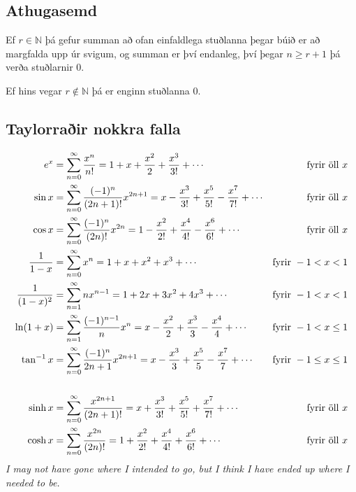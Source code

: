 \documentclass[b5paper,10pt,icelandic]{sphinxmanual}
\begin{document}
\subsection{Athugasemd}
\label{kafli10:id6}
Ef \(r \in {{\mathbb  N}}\) þá gefur summan að ofan einfaldlega
stuðlanna þegar búið er að margfalda upp úr svigum, og summan er því
endanleg, því þegar \(n \geq r+1\) þá verða stuðlarnir 0.

Ef hins vegar \(r\notin {{\mathbb  N}}\) þá er enginn stuðlanna 0.


\subsection{Taylorraðir nokkra falla}
\label{kafli10:taylorrair-nokkra-falla}\begin{gather}
\begin{split}\begin{aligned}
e^x&=\sum_{n=0}^\infty\frac{x^n}{n!}
    =1+x+\frac{x^2}{2}+\frac{x^3}{3!}
    +\cdots
  &\mbox{fyrir öll }x\\
\sin x&=  \sum_{n=0}^\infty\frac{(-1)^n}{(2n+1)!}x^{2n+1}
    =x-\frac{x^3}{3!}+\frac{x^5}{5!}-\frac{x^7}{7!}+\cdots
    &\mbox{fyrir öll }x\\
\cos x&=  \sum_{n=0}^\infty\frac{(-1)^n}{(2n)!}x^{2n}
    =1-\frac{x^2}{2!}+\frac{x^4}{4!}-\frac{x^6}{6!}+\cdots
    &\mbox{fyrir öll }x\\
\frac{1}{1-x}&=\sum_{n=0}^\infty x^n
    =1+x+x^2+x^3+\cdots
&\mbox{fyrir }-1<x<1\\
\frac{1}{(1-x)^2}&=\sum_{n=1}^\infty nx^{n-1}
    =1+2x+3x^2+4x^3+\cdots
&\mbox{fyrir }-1<x<1\\
\ln(1+x)&=  \sum_{n=1}^\infty\frac{(-1)^{n-1}}{n}x^n
    =x-\frac{x^2}{2}+\frac{x^3}{3}-\frac{x^4}{4}+\cdots
    &\mbox{fyrir }-1<x\leq 1\\
\tan^{-1} x&=  \sum_{n=0}^\infty\frac{(-1)^n}{2n+1}x^{2n+1}
    =x-\frac{x^3}{3}+\frac{x^5}{5}-\frac{x^7}{7}+\cdots
    &\mbox{fyrir }-1\leq x\leq 1\\\\
\sinh x&=  \sum_{n=0}^\infty\frac{x^{2n+1}}{(2n+1)!}
    =x+\frac{x^3}{3!}+\frac{x^5}{5!}+\frac{x^7}{7!}+\cdots
    &\mbox{fyrir öll } x\\
\cosh x&=  \sum_{n=0}^\infty\frac{x^{2n}}{(2n)!}
    =1+\frac{x^2}{2!}+\frac{x^4}{4!}+\frac{x^6}{6!}+\cdots
    &\mbox{fyrir öll } x\\\end{aligned}\end{split}\notag
\end{gather}
\emph{I may not have gone where I intended to go, but I think I have ended up where I needed to be.}
\end{document}
